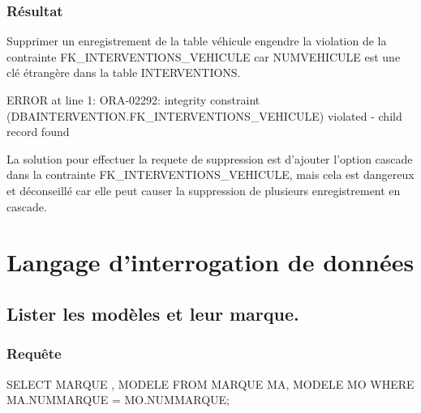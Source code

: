 \documentclass[•]{article}
\begin{document}
\subsubsection{Résultat}
\textrm{Supprimer un enregistrement de la table véhicule engendre la violation de la contrainte FK\_INTERVENTIONS\_VEHICULE car NUMVEHICULE est une clé étrangère dans la table INTERVENTIONS. }
\begin{sql}
ERROR at line 1:
ORA-02292: integrity constraint (DBAINTERVENTION.FK_INTERVENTIONS_VEHICULE) violated -
child record found 
\end{sql}
\textrm{La solution pour effectuer la requete de suppression est d'ajouter l'option cascade dans la contrainte FK\_INTERVENTIONS\_VEHICULE, mais cela est dangereux et déconseillé car elle peut causer la suppression de plusieurs enregistrement en cascade.}
\section{Langage d'interrogation de données}
\subsection{Lister les modèles et leur marque.}
\subsubsection{Requête}
\begin{sql}
SELECT MARQUE , MODELE FROM MARQUE MA, MODELE MO WHERE MA.NUMMARQUE = MO.NUMMARQUE;\end{sql}
\end{document}
